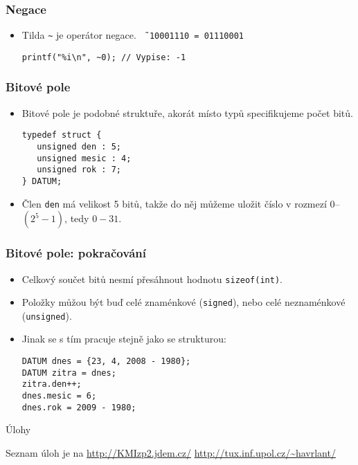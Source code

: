 \documentclass{beamer}
\newenvironment{itemizex}%
  {\large \begin{itemize}%
    \setlength{\itemsep}{8pt}%
    \setlength{\parskip}{8pt}}%
  {\end{itemize}}
\begin{document}
\begin{frame}[t,fragile]\frametitle{Negace} 
    \begin{itemizex}
        \item Tilda \texttt{\~} je operátor negace. \texttt{\~\, 10001110 = 01110001}
        \begin{verbatim} 
printf("%i\n", ~0); // Vypise: -1
        \end{verbatim}
    \end{itemizex}
\end{frame}


\begin{frame}[t,fragile]\frametitle{Bitové pole} 
    \begin{itemizex}
        \item Bitové pole je podobné struktuře, akorát místo typů specifikujeme počet bitů. 
\begin{verbatim} 
typedef struct {
   unsigned den : 5;
   unsigned mesic : 4;
   unsigned rok : 7;
} DATUM;
\end{verbatim}
        \item Člen \texttt{den} má velikost 5 bitů, takže do něj můžeme uložit číslo v rozmezí $0$--$(2^5-1)$, tedy $0-31$.
    \end{itemizex}
\end{frame}


\begin{frame}[t,fragile]\frametitle{Bitové pole: pokračování} 
    \begin{itemizex}
        \item Celkový součet bitů nesmí přesáhnout hodnotu \texttt{sizeof(int)}.
        \item Položky můžou být buď celé znaménkové (\texttt{signed}), nebo celé neznaménkové (\texttt{unsigned}).
        \item Jinak se s tím pracuje stejně jako se strukturou:
\begin{verbatim} 
DATUM dnes = {23, 4, 2008 - 1980};
DATUM zitra = dnes;
zitra.den++;
dnes.mesic = 6;
dnes.rok = 2009 - 1980;
\end{verbatim}
    \end{itemizex}
\end{frame}


\begin{frame}[t,fragile]{Úlohy}
\begin{center}
\vskip 1cm
{\Large Seznam úloh je na \url{http://KMIzp2.jdem.cz/}}
\vskip 2cm
\url{http://tux.inf.upol.cz/~havrlant/}
\end{center}
\end{frame}
\end{document}
